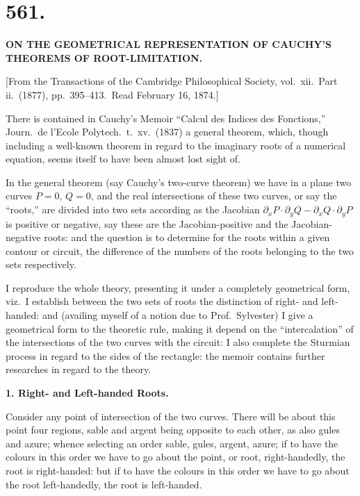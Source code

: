 \documentclass[12pt,a4paper]{article}
\theoremstyle{plain}
\theoremstyle{definition}
\begin{document}
\section*{\textbf{561.}}

\begin{center}
{\large \textbf{ON THE GEOMETRICAL REPRESENTATION OF CAUCHY'S}}\\[4pt]
{\large \textbf{THEOREMS OF ROOT-LIMITATION.}}
\end{center}

\begin{flushright}
{\small [From the Transactions of the Cambridge Philosophical Society, vol.\ xii.\ Part ii.\ (1877), pp.\ 395--413.\ Read February 16, 1874.]}
\end{flushright}

There is contained in Cauchy's Memoir ``Calcul des Indices des Fonctions,'' Journ.\ de l'Ecole Polytech.\ t.\ xv.\ (1837) a general theorem, which, though including a well-known theorem in regard to the imaginary roots of a numerical equation, seems itself to have been almost lost sight of.

In the general theorem (say Cauchy's two-curve theorem) we have in a plane two curves $P = 0$, $Q = 0$, and the real intersections of these two curves, or say the ``roots,'' are divided into two sets according as the Jacobian $\partial_x P \cdot \partial_y Q - \partial_x Q \cdot \partial_y P$ is positive or negative, say these are the Jacobian-positive and the Jacobian-negative roots: and the question is to determine for the roots within a given contour or circuit, the difference of the numbers of the roots belonging to the two sets respectively.

I reproduce the whole theory, presenting it under a completely geometrical form, viz.\ I establish between the two sets of roots the distinction of right- and left-handed: and (availing myself of a notion due to Prof.\ Sylvester) I give a geometrical form to the theoretic rule, making it depend on the ``intercalation'' of the intersections of the two curves with the circuit: I also complete the Sturmian process in regard to the sides of the rectangle: the memoir contains further researches in regard to the theory.

\textbf{1. Right- and Left-handed Roots.}

Consider any point of intersection of the two curves. There will be about this point four regions, sable and argent being opposite to each other, as also gules and azure; whence selecting an order sable, gules, argent, azure; if to have the colours in this order we have to go about the point, or root, right-handedly, the root is right-handed: but if to have the colours in this order we have to go about the root left-handedly, the root is left-handed.
\end{document}
